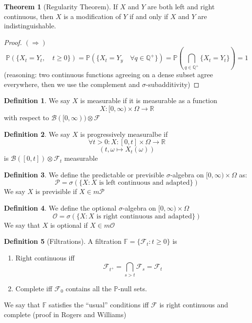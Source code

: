\documentclass[11pt,a4paper]{article}
\theoremstyle{definition}
\newtheorem{definition}{Definition}[section]
\newtheorem{theorem}{Theorem}[section]
\begin{document}
\begin{theorem}[Regularity Theorem]\label{thm:regularity}
If $X$ and $Y$ are both left and right continuous, then $X$ is a modification of $Y$ if and only if $X$ and $Y$ are indistinguishable.
\end{theorem}

\begin{proof}
$(\Rightarrow)$ \[
\mathbb{P}(\{X_t = Y_t, \quad t \ge 0\}) = \mathbb{P}(\{X_t = Y_y \quad \forall q \in \mathbb{Q}^+\}) = \mathbb{P} \left (\bigcap_{q \in \mathbb{Q}^+} \{X_t = Y_t\}\right ) = 1
\]
(reasoning: two continuous functions agreeing on a dense subset agree everywhere, then we use the complement and $\sigma$-subadditivity)
\end{proof}

\begin{definition}
We say $X$ is measurable if it is measurable as a function \[
X: [0, \infty) \times \Omega \to \mathbb{R}
\]
with respect to $\mathcal{B}([0, \infty)) \otimes \mathcal{F}$
\end{definition}

\begin{definition}
We say $X$ is progressively measuralbe if \[
\forall t > 0: X:[0,t] \times \Omega \to \mathbb{R}
\]
\[
(t, \omega \mapsto X_t(\omega))
\]
is $\mathcal{B}([0,t]) \otimes \mathcal{F}_t$ measurable
\end{definition}

\begin{definition}
We define the predictable or previsible $\sigma$-algebra on $[0, \infty) \times \Omega$ as: \[
\mathcal{P} = \sigma (\{X:X \text{ is left continuous and adapted}\})
\]
We say $X$ is previsible if $X \in m\mathcal{P}$
\end{definition}

\begin{definition}
We define the optional $\sigma$-algebra on $[0, \infty) \times \Omega$ \[
\mathcal{O} = \sigma (\{X:X\text{ is right continuous and adapted}\})
\]
We say that $X$ is optional if $X \in m\mathcal{O}$
\end{definition}

\begin{definition}[Filtrations]
A filtration $\mathbb{F} = \{\mathcal{F}_t:t\ge 0\}$ is 
\begin{enumerate}
    \item Right continuous iff \[
        \mathcal{F}_{t^+} = \bigcap \limits _{s > t} \mathcal{F}_s = \mathcal{F}_t
    \]
    \item Complete iff $\mathcal{F}_0$ contains all the $\mathbb{P}$-null sets.
\end{enumerate}
We say that $\mathbb{F}$ satisfies the ``usual'' conditions iff $\mathcal{F}$ is right continuous and complete (proof in Rogers and Williams)
\end{definition}
\end{document}
